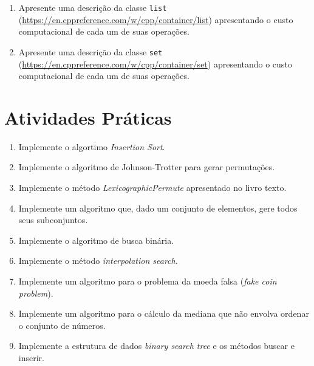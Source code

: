 \documentclass{article}
\begin{document}
\begin{enumerate}
    \item Apresente uma descrição da classe \texttt{list} (\url{https://en.cppreference.com/w/cpp/container/list}) apresentando o custo computacional de cada um de suas operações.
    \item Apresente uma descrição da classe \texttt{set} (\url{https://en.cppreference.com/w/cpp/container/set}) apresentando o custo computacional de cada um de suas operações.
\end{enumerate}

\section{Atividades Práticas}

\begin{enumerate}
    \item Implemente o algortimo \textit{Insertion Sort}.
    \item Implemente o algoritmo de Johnson-Trotter para gerar permutações.
    \item Implemente o método \textit{LexicographicPermute} apresentado no livro texto.
    \item Implemente um algoritmo que, dado um conjunto de elementos, gere todos seus subconjuntos.
    \item Implemente o algoritmo de busca binária.
    \item Implemente o método \textit{interpolation search}.
    \item Implemente um algoritmo para o problema da moeda falsa (\textit{fake coin problem}).
    \item Implemente um algoritmo para o cálculo da mediana que não envolva ordenar o conjunto de números.
    \item Implemente a estrutura de dados \textit{binary search tree} e os métodos buscar e inserir.
\end{enumerate}


%
%
\end{document}
